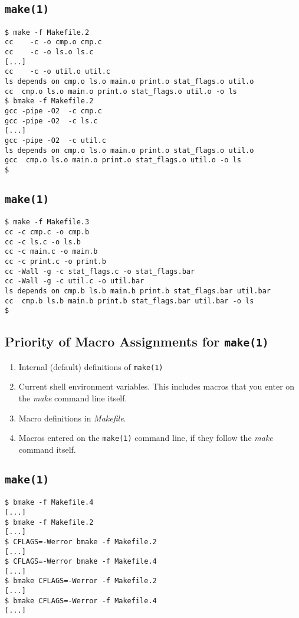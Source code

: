 \documentclass[xga]{xdvislides}
\begin{document}
\subsection{{\tt make(1)}}
\begin{verbatim}
$ make -f Makefile.2
cc    -c -o cmp.o cmp.c
cc    -c -o ls.o ls.c
[...]
cc    -c -o util.o util.c
ls depends on cmp.o ls.o main.o print.o stat_flags.o util.o
cc  cmp.o ls.o main.o print.o stat_flags.o util.o -o ls
$ bmake -f Makefile.2
gcc -pipe -O2  -c cmp.c
gcc -pipe -O2  -c ls.c
[...]
gcc -pipe -O2  -c util.c
ls depends on cmp.o ls.o main.o print.o stat_flags.o util.o
gcc  cmp.o ls.o main.o print.o stat_flags.o util.o -o ls
$
\end{verbatim}

\subsection{{\tt make(1)}}
\begin{verbatim}
$ make -f Makefile.3
cc -c cmp.c -o cmp.b
cc -c ls.c -o ls.b
cc -c main.c -o main.b
cc -c print.c -o print.b
cc -Wall -g -c stat_flags.c -o stat_flags.bar
cc -Wall -g -c util.c -o util.bar
ls depends on cmp.b ls.b main.b print.b stat_flags.bar util.bar
cc  cmp.b ls.b main.b print.b stat_flags.bar util.bar -o ls
$
\end{verbatim}


\subsection{Priority of Macro Assignments for {\tt make(1)}}

\begin{enumerate}
	\item Internal (default) definitions of {\tt make(1)}
	\item Current shell environment variables.  This includes macros that you
		enter on the {\em make} command line itself.
	\item Macro definitions in {\em Makefile}.
	\item Macros entered on the {\tt make(1)} command line, if they follow
		the {\em make} command itself.
\end{enumerate}

\subsection{{\tt make(1)}}

\begin{verbatim}
$ bmake -f Makefile.4
[...]
$ bmake -f Makefile.2
[...]
$ CFLAGS=-Werror bmake -f Makefile.2
[...]
$ CFLAGS=-Werror bmake -f Makefile.4
[...]
$ bmake CFLAGS=-Werror -f Makefile.2
[...]
$ bmake CFLAGS=-Werror -f Makefile.4
[...]
\end{verbatim}
\end{document}
